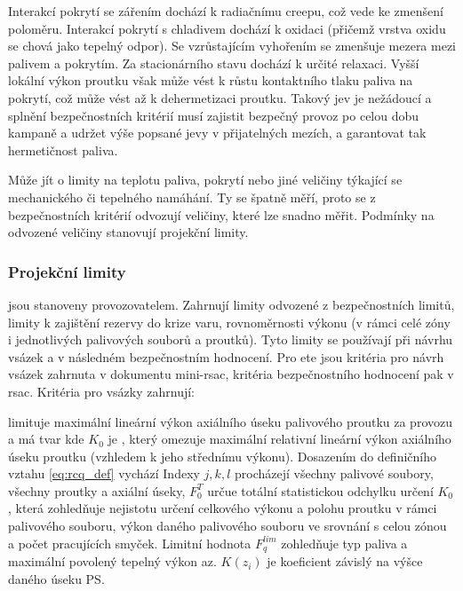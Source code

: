Interakcí pokrytí se zářením dochází k radiačnímu creepu, což vede ke zmenšení poloměru. Interakcí pokrytí s chladivem dochází k oxidaci (přičemž 
vrstva oxidu se chová jako tepelný odpor). Se vzrůstajícím vyhořením se zmenšuje mezera mezi palivem a pokrytím. Za stacionárního stavu dochází 
k určité relaxaci. Vyšší lokální výkon proutku však může vést k růstu kontaktního tlaku paliva na pokrytí, což může vést až k dehermetizaci proutku. 
Takový jev je nežádoucí a splnění bezpečnostních kritérií musí zajistit bezpečný provoz po celou dobu kampaně a udržet výše popsané jevy v přijatelných 
mezích, a garantovat tak hermetičnost paliva.

Může jít o limity na teplotu paliva, pokrytí nebo jiné veličiny týkající se mechanického či tepelného namáhání. Ty se špatně měří, proto se z bezpečnostních kritérií odvozují veličiny, které lze snadno měřit. 
Podmínky na odvozené veličiny stanovují projekční limity.

\subsubsection*{Projekční limity} jsou stanoveny provozovatelem. Zahrnují limity odvozené z bezpečnostních limitů, limity k zajištění rezervy do krize varu, 
rovnoměrnosti výkonu (v rámci celé zóny i jednotlivých palivových souborů a proutků). Tyto limity se používají při návrhu vsázek a v následném 
bezpečnostním hodnocení. Pro \ac{ete} jsou kritéria pro návrh vsázek zahrnuta v dokumentu mini-\ac{rsac}, kritéria bezpečnostního hodnocení 
pak v \ac{rsac}. Kritéria pro vsázky zahrnují:

 limituje maximální lineární výkon axiálního úseku palivového proutku za provozu a má tvar
kde 
$K_0$ je , který omezuje maximální relativní lineární výkon axiálního úseku 
proutku (vzhledem k jeho střednímu výkonu). 
Dosazením do definičního vztahu \eqref{eq:rcq_def} vychází
Indexy $j,k,l$ procházejí všechny palivové soubory, všechny proutky a axiální úseky, $F_0^T$ určue totální statistickou odchylku určení $K_0$, 
která zohledňuje nejistotu určení celkového výkonu a polohu proutku v rámci palivového souboru, výkon daného palivového souboru ve srovnání s celou 
zónou a počet pracujících smyček. Limitní hodnota $F_q^{lim}$ zohledňuje typ paliva a maximální povolený tepelný výkon \ac{az}. $K(z_i)$ je koeficient 
závislý na výšce daného úseku PS.

